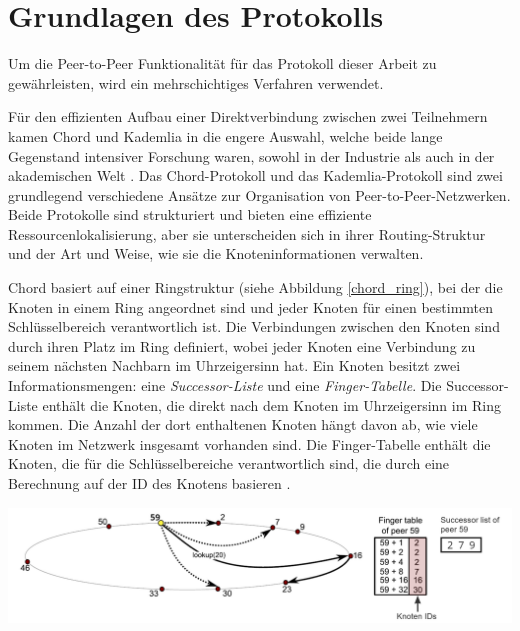 \section{Grundlagen des Protokolls}
\label{sec:grundlagen_des_protokolls}


Um die Peer-to-Peer Funktionalität für das Protokoll dieser Arbeit zu gewährleisten, wird ein mehrschichtiges Verfahren verwendet.

Für den effizienten Aufbau einer Direktverbindung zwischen zwei Teilnehmern kamen Chord und Kademlia in die engere Auswahl, welche beide lange Gegenstand intensiver Forschung waren, sowohl in der Industrie als auch in der akademischen Welt \parencite[S. 808]{MedranoChavez_ChordKademliaHighChurnScenarios}. 
Das Chord-Protokoll und das Kademlia-Protokoll sind zwei grundlegend verschiedene Ansätze zur Organisation von Peer-to-Peer-Netzwerken. Beide Protokolle sind strukturiert und bieten eine effiziente Ressourcenlokalisierung, aber sie unterscheiden sich in ihrer Routing-Struktur und der Art und Weise, wie sie die Knoteninformationen verwalten.

Chord basiert auf einer Ringstruktur (siehe Abbildung \ref{chord_ring}), bei der die Knoten in einem Ring angeordnet sind und jeder Knoten für einen bestimmten Schlüsselbereich verantwortlich ist. Die Verbindungen zwischen den Knoten sind durch ihren Platz im Ring definiert, wobei jeder Knoten eine Verbindung zu seinem nächsten Nachbarn im Uhrzeigersinn hat. Ein Knoten besitzt zwei Informationsmengen: eine \textit{Successor-Liste} und eine \textit{Finger-Tabelle}. Die Successor-Liste enthält die Knoten, die direkt nach dem Knoten im Uhrzeigersinn im Ring kommen. Die Anzahl der dort enthaltenen Knoten hängt davon ab, wie viele Knoten im Netzwerk insgesamt vorhanden sind. Die Finger-Tabelle enthält die Knoten, die für die Schlüsselbereiche verantwortlich sind, die durch eine Berechnung auf der ID des Knotens basieren \Parencite[S. 810-811]{MedranoChavez_ChordKademliaHighChurnScenarios}.

\begin{center}
    \captionsetup{type=figure}
    \includegraphics[width=1\linewidth]{images/chord_ring_altered.png}
    \label{chord_ring}
\end{center}

